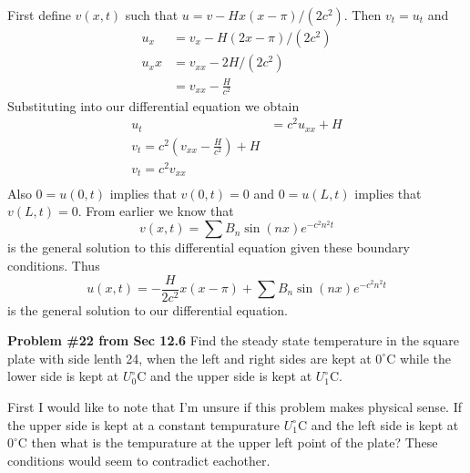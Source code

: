 \documentclass[12pt]{article}
\newcommand{\problem}[1]{\hspace{-4 ex} \large \textbf{Problem #1} }
\begin{document}
	First define $v(x,t)$ such that $u = v - Hx(x-\pi)/(2c^2)$. Then $v_t = u_t$ and
	\begin{align*}
		u_x & = v_x - H(2x-\pi)/(2c^2) \\
		u_xx & = v_{xx} - 2H/(2c^2)\\
		& = v_{xx} - \tfrac{H}{c^2}
	\end{align*}
	Substituting into our differential equation we obtain
	\begin{align*}
		u_t & = c^2u_{xx} + H \\
		v_t = c^2(v_{xx} - \tfrac{H}{c^2}) + H \\
		v_t = c^2v_{xx}\\
	\end{align*}
	Also $0 = u(0,t)$ implies that $v(0,t) = 0$ and $0 = u(L,t)$ implies that $v(L,t) = 0$. From earlier we know that 
	$$
	v(x,t) = \sum B_n \sin(nx) e^{-c^2n^2t}
	$$
	is the general solution to this differential equation given these boundary conditions. Thus
	$$
	u(x,t) = -\frac{H}{2c^2}x(x-\pi) + \sum B_n \sin(nx) e^{-c^2n^2t}
	$$
	is the general solution to our differential equation. 
	\bigbreak

\problem{\#22 from Sec 12.6} Find the steady state temperature in the square plate with side lenth 24, when the left and right sides are kept at $0^\circ$C while the lower side is kept at $U_0^\circ$C and the upper side is kept at $U_1^\circ$C. \bigbreak

	First I would like to note that I'm unsure if this problem makes physical sense. If the upper side is kept at a constant tempurature $U_1^\circ$C and the left side is kept at $0^\circ$C then what is the tempurature at the upper left point of the plate? These conditions would seem to contradict eachother. \bigbreak
	
\end{document}
